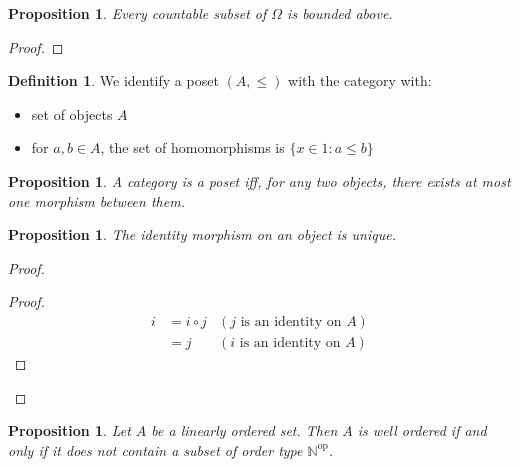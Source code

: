 \documentclass{book}
\let\qed\relax
\newtheorem{prop}[ax]{Proposition}
\theoremstyle{definition}
\newtheorem{df}[ax]{Definition}
\begin{document}
\begin{prop}
Every countable subset of $\Omega$ is bounded above.
\end{prop}

\begin{proof}
\pf
{}
\qed
\end{proof}

\begin{df}
We identify a poset $(A, \leq)$ with the category with:
\begin{itemize}
\item set of objects $A$
\item for $a,b \in A$, the set of homomorphisms is $\{ x \in 1 : a \leq b \}$
\end{itemize}
\end{df}

\begin{prop}
A category is a poset iff, for any two objects, there exists at most one morphism between them.
\end{prop}

\begin{prop}
The identity morphism on an object is unique.
\end{prop}

\begin{proof}
\pf
{}
\begin{proof}
	\pf
	\begin{align*}
		i & = i \circ j & (j \text{ is an identity on } A) \\
		& = j & (i \text{ is an identity on } A)
	\end{align*}
\end{proof}
\qed
\end{proof}

\begin{prop}
Let $A$ be a linearly ordered set. Then $A$ is well ordered if and only if it does not contain a subset of order type $\mathbb{N}^\mathrm{op}$.
\end{prop}
\end{document}
